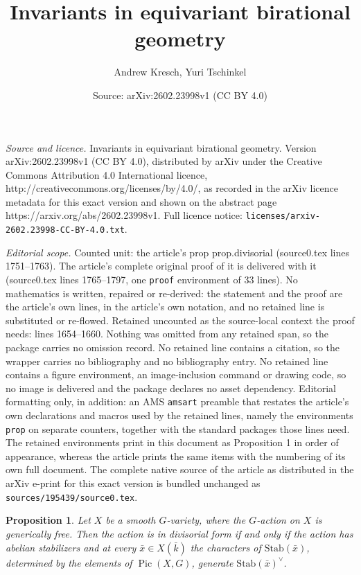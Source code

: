 \documentclass[10pt,a4paper]{amsart}
\title{Invariants in equivariant birational geometry}
\author{Andrew Kresch, Yuri Tschinkel}
\date{Source: arXiv:2602.23998v1 (CC BY 4.0)}
\newtheorem{prop}{Proposition}
\DeclareMathOperator{\Pic}{Pic}
\begin{document}
\maketitle

\noindent\emph{Source and licence.} Invariants in equivariant birational geometry. Version arXiv:2602.23998v1 (CC BY 4.0), distributed by arXiv under the Creative Commons Attribution 4.0 International licence, http://creativecommons.org/licenses/by/4.0/, as recorded in the arXiv licence metadata for this exact version and shown on the abstract page https://arxiv.org/abs/2602.23998v1. Full licence notice: \texttt{licenses/arxiv-2602.23998-CC-BY-4.0.txt}.\par\smallskip

\noindent\textit{Editorial scope.} Counted unit: the article's prop prop.divisorial (source0.tex lines 1751--1763). The article's complete original proof of it is delivered with it (source0.tex lines 1765--1797, one \texttt{proof} environment of 33 lines). No mathematics is written, repaired or re-derived: the statement and the proof are the article's own lines, in the article's own notation, and no retained line is substituted or re-flowed.  Retained uncounted as the source-local context the proof needs: lines 1654--1660.  Nothing was omitted from any retained span, so the package carries no omission record.  No retained line contains a citation, so the wrapper carries no bibliography and no bibliography entry.  No retained line contains a figure environment, an image-inclusion command or drawing code, so no image is delivered and the package declares no asset dependency.  Editorial formatting only, in addition: an AMS \texttt{amsart} preamble that restates the article's own declarations and macros used by the retained lines, namely the environments \texttt{prop} on separate counters, together with the standard packages those lines need.  The retained environments print in this document as Proposition 1 in order of appearance, whereas the article prints the same items with the numbering of its own full document.  The complete native source of the article as distributed in the arXiv e-print for this exact version is bundled unchanged as \texttt{sources/195439/source0.tex}.
\begin{prop}
\label{prop.divisorialform}
Let $X$ be a smooth $G$-variety, where the $G$-action on $X$ is generically free.
Then the action is in divisorial form if and only if the action has abelian stabilizers and at every $\bar x\in X(\bar k)$ the characters of $\mathrm{Stab}(\bar x)$, determined by the elements of $\Pic(X,G)$,
generate
$\mathrm{Stab}(\bar x)^\vee$.
\end{prop}
\end{document}
